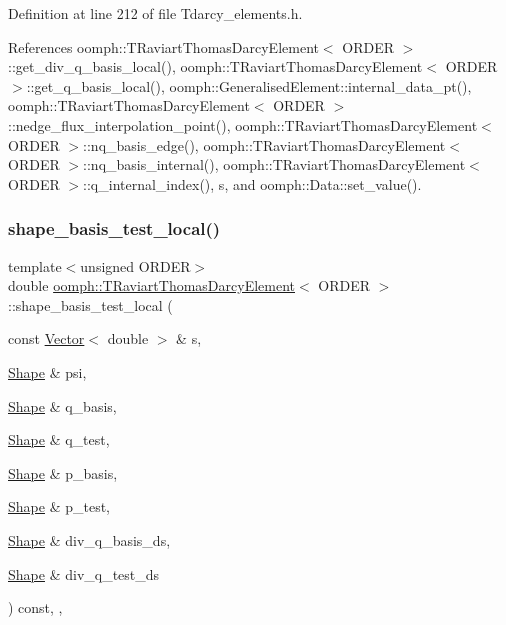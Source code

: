 Definition at line 212 of file Tdarcy\+\_\+elements.\+h.



References oomph\+::\+T\+Raviart\+Thomas\+Darcy\+Element$<$ O\+R\+D\+E\+R $>$\+::get\+\_\+div\+\_\+q\+\_\+basis\+\_\+local(), oomph\+::\+T\+Raviart\+Thomas\+Darcy\+Element$<$ O\+R\+D\+E\+R $>$\+::get\+\_\+q\+\_\+basis\+\_\+local(), oomph\+::\+Generalised\+Element\+::internal\+\_\+data\+\_\+pt(), oomph\+::\+T\+Raviart\+Thomas\+Darcy\+Element$<$ O\+R\+D\+E\+R $>$\+::nedge\+\_\+flux\+\_\+interpolation\+\_\+point(), oomph\+::\+T\+Raviart\+Thomas\+Darcy\+Element$<$ O\+R\+D\+E\+R $>$\+::nq\+\_\+basis\+\_\+edge(), oomph\+::\+T\+Raviart\+Thomas\+Darcy\+Element$<$ O\+R\+D\+E\+R $>$\+::nq\+\_\+basis\+\_\+internal(), oomph\+::\+T\+Raviart\+Thomas\+Darcy\+Element$<$ O\+R\+D\+E\+R $>$\+::q\+\_\+internal\+\_\+index(), s, and oomph\+::\+Data\+::set\+\_\+value().

\mbox{\label{classoomph_1_1TRaviartThomasDarcyElement_abf52dcfe30546dd3e2617c1253580dfc}} 
\subsubsection{\texorpdfstring{shape\+\_\+basis\+\_\+test\+\_\+local()}{shape\_basis\_test\_local()}}
{\footnotesize\ttfamily template$<$unsigned O\+R\+D\+ER$>$ \\
double \hyperlink{classoomph_1_1TRaviartThomasDarcyElement}{oomph\+::\+T\+Raviart\+Thomas\+Darcy\+Element}$<$ O\+R\+D\+ER $>$\+::shape\+\_\+basis\+\_\+test\+\_\+local (\begin{DoxyParamCaption}\item[{const \hyperlink{classoomph_1_1Vector}{Vector}$<$ double $>$ \&}]{s,  }\item[{\hyperlink{classoomph_1_1Shape}{Shape} \&}]{psi,  }\item[{\hyperlink{classoomph_1_1Shape}{Shape} \&}]{q\+\_\+basis,  }\item[{\hyperlink{classoomph_1_1Shape}{Shape} \&}]{q\+\_\+test,  }\item[{\hyperlink{classoomph_1_1Shape}{Shape} \&}]{p\+\_\+basis,  }\item[{\hyperlink{classoomph_1_1Shape}{Shape} \&}]{p\+\_\+test,  }\item[{\hyperlink{classoomph_1_1Shape}{Shape} \&}]{div\+\_\+q\+\_\+basis\+\_\+ds,  }\item[{\hyperlink{classoomph_1_1Shape}{Shape} \&}]{div\+\_\+q\+\_\+test\+\_\+ds }\end{DoxyParamCaption}) const\hspace{0.3cm}{\ttfamily [inline]}, {\ttfamily [protected]}, {\ttfamily [virtual]}}



